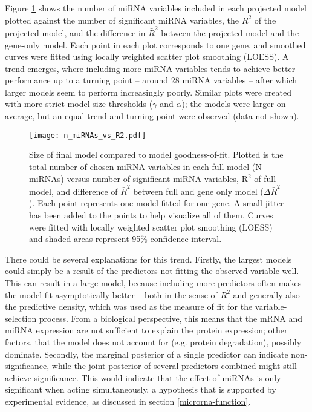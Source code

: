 Figure \ref{n-miRNAs-vs-R2} shows the number of miRNA variables included in
each projected model plotted against the number of significant miRNA
variables, the $R^2$ of the projected model, and the difference in $\bar{R}^2$
between the projected model and the gene-only model. Each point in each plot
corresponds to one gene, and smoothed curves were fitted using locally
weighted scatter plot smoothing (LOESS). A trend emerges, where including more
miRNA variables tends to achieve better performance up to a turning point --
around 28 miRNA variables -- after which larger models seem to perform
increasingly poorly. Similar plots were created with more strict model-size
thresholds ($\gamma$ and $\alpha$); the models were larger on
average, but an equal trend and turning point were observed (data not shown).

\begin{figure}[htb]
  \centering
  \texttt{[image: n\_miRNAs\_vs\_R2.pdf]}
  \caption{Size of final model compared to model goodness-of-fit. Plotted is the total number of chosen miRNA variables in each full model (N miRNAs) versus number of significant miRNA variables, R$^2$ of full model, and difference of $\bar{R}^2$ between full and gene only model ($\Delta\bar{R}^2$). Each point represents one model fitted for one gene. A small jitter has been added to the points to help visualize all of them. Curves were fitted with locally weighted scatter plot smoothing (LOESS) and shaded areas represent 95\% confidence interval. \label{n-miRNAs-vs-R2}}
\end{figure}

There could be several explanations for this trend. Firstly, the largest
models could simply be a result of the predictors not fitting the observed
variable well. This can result in a large model, because including more
predictors often makes the model fit asymptotically better -- both in the
sense of $R^2$ and generally also the predictive density, which was used as
the measure of fit for the variable-selection process. From a biological
perspective, this means that the mRNA and miRNA expression are not sufficient
to explain the protein expression; other factors, that the model does not
account for (e.g. protein degradation), possibly dominate.
Secondly, the marginal posterior of a single predictor can indicate
non-significance, while the joint posterior of several predictors combined
might still achieve significance. This would indicate that the effect of
miRNAs is only significant when acting simultaneously, a hypothesis that is
supported by experimental evidence, as discussed in section
\ref{microrna-function}.

